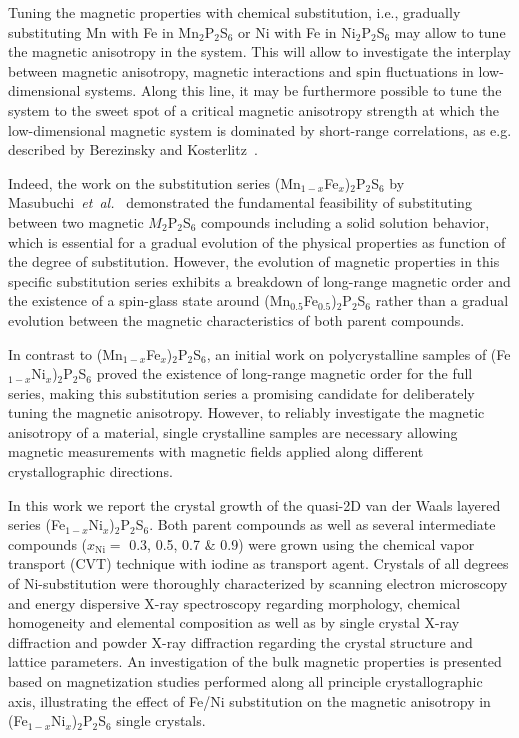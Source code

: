 \documentclass[twocolumn,superscriptaddress,prb,preprintnumbers,nobibnotes,aps]{revtex4-2}  %
\begin{document}
Tuning the magnetic properties with chemical substitution, i.e., gradually substituting Mn with Fe in Mn$_2$P$_2$S$_6$ or Ni with Fe in Ni$_2$P$_2$S$_6$ may allow to tune the magnetic anisotropy in the system. This will allow to investigate the interplay between magnetic anisotropy, magnetic interactions and spin fluctuations in low-dimensional systems. Along this line, it may be furthermore possible to tune the system to the sweet spot of a critical magnetic anisotropy strength at which the low-dimensional magnetic system is dominated by short-range correlations, as e.g. described by Berezinsky and Kosterlitz~\cite{Kosterlitz1973,Berezinsky1970}.

Indeed, the work on the substitution series (Mn$_{1-x}$Fe$_{x}$)$_2$P$_2$S$_6$ by Masubuchi~\textit{et~al.}~\cite{Masubuchi2008} demonstrated the fundamental feasibility of substituting between two magnetic $M_2$P$_2$S$_6$ compounds including a solid solution behavior, which is essential for a gradual evolution of the physical properties as function of the degree of substitution. However, the evolution of magnetic properties in this specific substitution series exhibits a breakdown of long-range magnetic order and the existence of a spin-glass state around (Mn$_{0.5}$Fe$_{0.5}$)$_2$P$_2$S$_6$ rather than a gradual evolution between the magnetic characteristics of both parent compounds.

In contrast to (Mn$_{1-x}$Fe$_{x}$)$_2$P$_2$S$_6$, an initial work on polycrystalline samples of (Fe$_{1-x}$Ni$_x$)$_2$P$_2$S$_6$ \cite{RRao1992} proved the existence of long-range magnetic order for the full series, making this substitution series a promising candidate for deliberately tuning the magnetic anisotropy. However, to reliably investigate the magnetic anisotropy of a material, single crystalline samples are necessary allowing magnetic measurements with magnetic fields applied along different crystallographic directions.

In this work we report the crystal growth of the quasi-2D van der Waals layered series (Fe$_{1-x}$Ni$_x$)$_2$P$_2$S$_6$. Both parent compounds as well as several intermediate compounds ($x_\textrm{Ni} =$ 0.3, 0.5, 0.7 {\&} 0.9) were grown using the chemical vapor transport (CVT) technique with iodine as transport agent. Crystals of all degrees of Ni-substitution were thoroughly characterized by scanning electron microscopy and energy dispersive X-ray spectroscopy regarding morphology, chemical homogeneity and elemental composition as well as by single crystal X-ray diffraction and powder X-ray diffraction regarding the crystal structure and lattice parameters. An investigation of the bulk magnetic properties is presented based on magnetization studies performed along all principle crystallographic axis, illustrating the effect of Fe/Ni substitution on the magnetic anisotropy in (Fe$_{1-x}$Ni$_x$)$_2$P$_2$S$_6$ single crystals.
\end{document}
